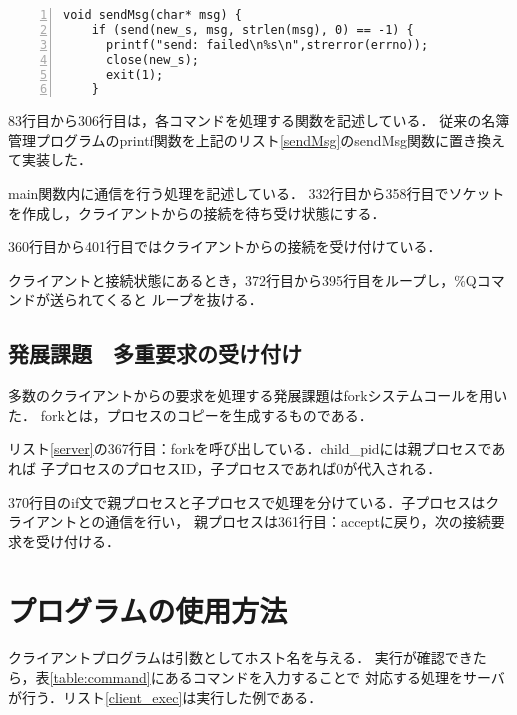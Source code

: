 \documentclass[11pt]{jarticle}
\begin{document}
\begin{lstlisting}[caption=sendMsg関数,label=sendMsg,numbers=left]
    void sendMsg(char* msg) {
    if (send(new_s, msg, strlen(msg), 0) == -1) {
      printf("send: failed\n%s\n",strerror(errno));
      close(new_s);
      exit(1);
    }
\end{lstlisting}

83行目から306行目は，各コマンドを処理する関数を記述している．
従来の名簿管理プログラムのprintf関数を上記のリスト\ref{sendMsg}のsendMsg関数に置き換えて実装した．

main関数内に通信を行う処理を記述している．
332行目から358行目でソケットを作成し，クライアントからの接続を待ち受け状態にする．

360行目から401行目ではクライアントからの接続を受け付けている．

クライアントと接続状態にあるとき，372行目から395行目をループし，\%Qコマンドが送られてくると
ループを抜ける．

\subsection{発展課題　多重要求の受け付け}

多数のクライアントからの要求を処理する発展課題はforkシステムコールを用いた．
forkとは，プロセスのコピーを生成するものである．

リスト\ref{server}の367行目：forkを呼び出している．child\_pidには親プロセスであれば
子プロセスのプロセスID，子プロセスであれば0が代入される．

370行目のif文で親プロセスと子プロセスで処理を分けている．子プロセスはクライアントとの通信を行い，
親プロセスは361行目：acceptに戻り，次の接続要求を受け付ける．

\section{プログラムの使用方法}

クライアントプログラムは引数としてホスト名を与える．
実行が確認できたら，表\ref{table:command}にあるコマンドを入力することで
対応する処理をサーバが行う．リスト\ref{client_exec}は実行した例である．
\end{document}
